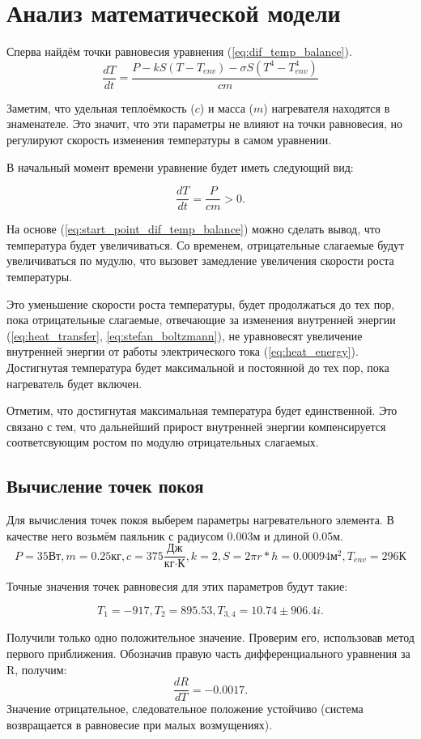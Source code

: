 \chapter{Анализ математической модели}
Сперва найдём точки равновесия уравнения (\ref{eq:dif_temp_balance}).
 \begin{equation}
	\frac{dT}{dt} = \frac{P - kS(T-T_{env}) - \sigma S (T^4 - T^4_{env})}{cm}
	\label{eq:dif_temp_balance2}
\end{equation}

Заметим, что удельная теплоёмкость ($c$) и масса ($m$) нагревателя находятся в знаменателе.
Это значит, что эти параметры не влияют на точки равновесия, но регулируют скорость изменения температуры в самом уравнении.

В начальный момент времени уравнение будет иметь следующий вид:

 \begin{equation}
	\frac{dT}{dt} = \frac{P}{cm} > 0.
	\label{eq:start_point_dif_temp_balance}
\end{equation}

На основе (\ref{eq:start_point_dif_temp_balance}) можно сделать вывод, что температура будет увеличиваться. 
Со временем, отрицательные слагаемые будут увеличиваться по мудулю, что вызовет замедление увеличения скорости роста температуры. 

Это уменьшение скорости роста температуры, будет продолжаться до тех пор, пока отрицательные слагаемые, отвечающие за изменения внутренней энергии (\ref{eq:heat_transfer}, \ref{eq:stefan_boltzmann}), не уравновесят увеличение внутренней энергии от работы электрического тока (\ref{eq:heat_energy}). Достигнутая температура будет максимальной и постоянной до тех пор, пока нагреватель будет включен.

Отметим, что достигнутая максимальная температура будет единственной. Это связано с тем, что дальнейший прирост внутренней энергии компенсируется соответсвующим ростом по модулю отрицательных слагаемых.

\section{Вычисление точек покоя}
Для вычисления точек покоя выберем параметры нагревательного элемента.
В качестве него возьмём паяльник с радиусом 0.003м и длиной 0.05м.
\[
	P=35\text{Вт}, m = 0.25\text{кг}, c=375\frac{\text{Дж}}{\text{кг}\cdot\text{К}},k = 2, S = 2\pi r * h = 0.00094 \text{м}^2,T_{env}= 296 \text{К}
\]

Точные значения точек равновесия для этих параметров будут такие:

 \[
T_1 = -917, T_2 = 895.53,  T_{3,4} = 10.74 \pm 906.4 i.
\]

Получили только одно положительное значение. Проверим его, использовав метод первого приближения. Обозначив правую часть дифференциального уравнения за R, получим:
\begin{equation}
	\frac{dR}{dT} = - 0.0017
	\label{eq:first_check}.
\end{equation}
Значение отрицательное, следовательное положение устойчиво (система возвращается в равновесие при малых возмущениях). 
